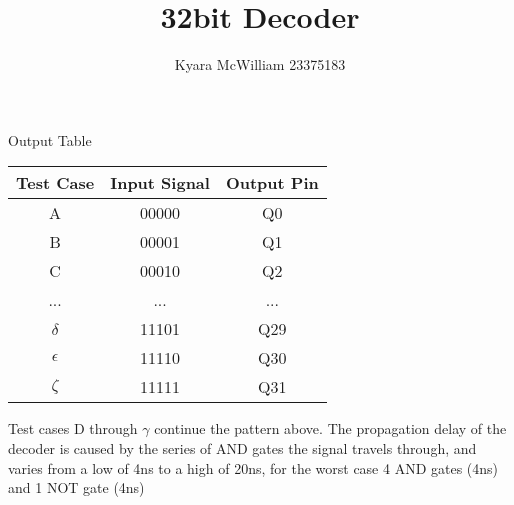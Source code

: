 \documentclass{article}
\title{32bit Decoder}
\author{Kyara McWilliam 23375183}
\date{}
\begin{document}
\maketitle

Output Table
\hfill \break

\begin{tabular}{ |c|c|c| }
\hline
Test Case & Input Signal & Output Pin \\
\hline
A & 00000 & Q0 \\
B & 00001 & Q1 \\
C & 00010 & Q2 \\ 
... & ... & ...\\
$\delta$ & 11101 & Q29 \\
$\epsilon$ & 11110 & Q30 \\
$\zeta$ & 11111 & Q31 \\
\hline
\end{tabular}

\hfill \break

Test cases D through $\gamma$ continue the pattern above. The propagation delay of the decoder is caused by the series of AND gates the signal travels through, and varies from a low of 4ns to a high of 20ns, for the worst case 4 AND gates (4ns) and 1 NOT gate (4ns) 
\end{document}
